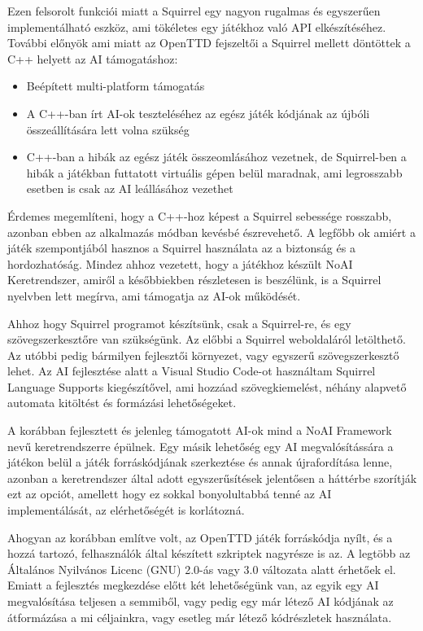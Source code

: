 Ezen felsorolt funkciói miatt a Squirrel egy nagyon rugalmas és egyszerűen implementálható eszköz, ami tökéletes egy játékhoz való API elkészítéséhez. További előnyök ami miatt az OpenTTD fejszeltői a Squirrel mellett döntöttek a C++ helyett az AI támogatáshoz:

\begin{itemize}
	\item Beépített multi-platform támogatás
	\item A C++-ban írt AI-ok teszteléséhez az egész játék kódjának az újbóli összeállítására lett volna szükség
	\item C++-ban a hibák az egész játék összeomlásához vezetnek, de Squirrel-ben a hibák a játékban futtatott virtuális gépen belül maradnak, ami legrosszabb esetben is csak az AI leállásához vezethet
\end{itemize}

Érdemes megemlíteni, hogy a C++-hoz képest a Squirrel sebessége rosszabb, azonban ebben az alkalmazás módban kevésbé észrevehető. A legfőbb ok amiért a játék szempontjából hasznos a Squirrel használata az a biztonság és a hordozhatóság. Mindez ahhoz vezetett, hogy a játékhoz készült NoAI Keretrendszer, amiről a későbbiekben részletesen is beszélünk, is a Squirrel nyelvben lett megírva, ami támogatja az AI-ok működését.

Ahhoz hogy Squirrel programot készítsünk, csak a Squirrel-re, és egy szövegszerkesztőre van szükségünk. Az előbbi a Squirrel weboldaláról letölthető. Az utóbbi pedig bármilyen fejlesztői környezet, vagy egyszerű szövegszerkesztő lehet. Az AI fejlesztése alatt a Visual Studio Code-ot használtam Squirrel Language Supports kiegészítővel, ami hozzáad szövegkiemelést, néhány alapvető automata kitöltést és formázási lehetőségeket.



A korábban fejlesztett és jelenleg támogatott AI-ok mind a NoAI Framework nevű keretrendszerre épülnek. Egy másik lehetőség egy AI megvalósítássára a játékon belül a játék forráskódjának szerkeztése és annak újrafordítása lenne, azonban a keretrendszer által adott egyszerűsítések jelentősen a háttérbe szorítják ezt az opciót, amellett hogy ez sokkal bonyolultabbá tenné az AI implementálását, az elérhetőségét is korlátozná.

Ahogyan az korábban említve volt, az OpenTTD játék forráskódja nyílt, és a hozzá tartozó, felhasználók által készített szkriptek nagyrésze is az. A legtöbb az Általános Nyilvános Licenc (GNU) 2.0-ás vagy 3.0 változata alatt érhetőek el. Emiatt a fejlesztés megkezdése előtt két lehetőségünk van, az egyik egy AI megvalósítása teljesen a semmiből, vagy pedig egy már létező AI kódjának az átformázása a mi céljainkra, vagy esetleg már létező kódrészletek használata.

